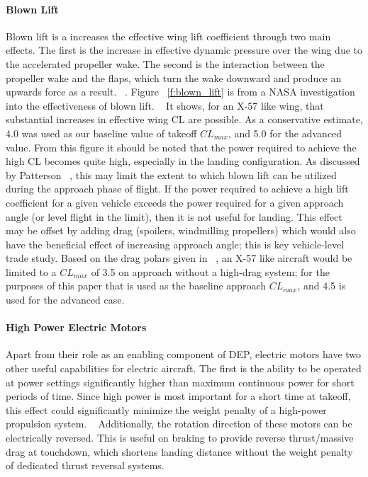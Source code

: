 \documentclass[]{aiaa-tc}%
\begin{document}
\paragraph{Blown Lift}
Blown lift is a increases the effective wing lift coefficient through two main effects.  The first is the increase in effective dynamic pressure over the wing due to the accelerated propeller wake.  The second is the interaction between the propeller wake and the flaps, which turn the wake downward and produce an upwards force as a result. ~\cite{MooreDEP}.  Figure ~\ref{f:blown_lift} is from a NASA investigation into the effectiveness of blown lift. ~\cite{Deere}  It shows, for an X-57 like wing, that substantial increases in effective wing CL are possible.  As a conservative estimate, 4.0 was used as our baseline value of takeoff $CL_{max}$, and 5.0 for the advanced value.  
From this figure it should be noted that the power required to achieve the high CL becomes quite high, especially in the landing configuration.  As discussed by Patterson ~\cite{Patterson2017}, this may limit the extent to which blown lift can be utilized during the approach phase of flight.  If the power required to achieve a high lift coefficient for a given vehicle exceeds the power required for a given approach angle (or level flight in the limit), then it is not useful for landing.  This effect may be offset by adding drag (spoilers, windmilling propellers) which would also have the beneficial effect of increasing approach angle; this is key vehicle-level trade study.  Based on the drag polars given in ~\cite{Deere}, an X-57 like aircraft would be limited to a $CL_{max}$ of 3.5 on approach without a high-drag system; for the purposes of this paper that is used as the baseline approach $CL_{max}$, and 4.5 is used for the advanced case.  

\paragraph{High Power Electric Motors}
Apart from their role as an enabling component of DEP, electric motors have two other useful capabilities for electric aircraft.  The first is the ability to be operated at power settings significantly higher than maximum continuous power for short periods of time.  Since high power is most important for a short time at takeoff, this effect could significantly minimize the weight penalty of a high-power propulsion system. ~\cite{Moore_Mis} Additionally, the rotation direction of these motors can be electrically reversed.  This is useful on braking to provide reverse thrust/massive drag at touchdown, which shortens landing distance without the weight penalty of dedicated thrust reversal systems.  
\end{document}
